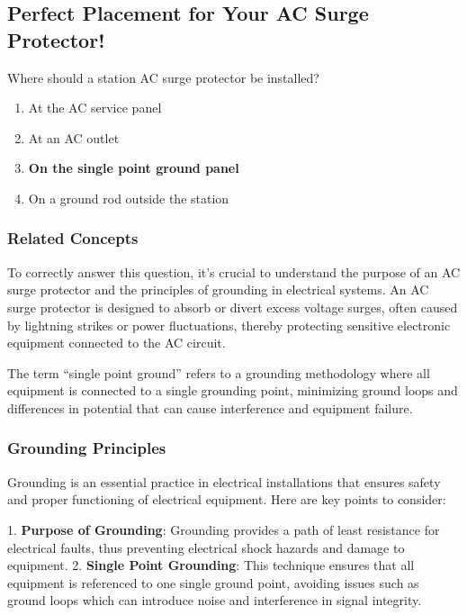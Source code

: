 \subsection{Perfect Placement for Your AC Surge Protector!}

\begin{tcolorbox}[colback=gray!10, colframe=black, title=E4E13]

Where should a station AC surge protector be installed?
\begin{enumerate}[label=\Alph*.]
    \item At the AC service panel
    \item At an AC outlet
    \item \textbf{On the single point ground panel}
    \item On a ground rod outside the station
\end{enumerate} \end{tcolorbox}

\subsubsection{Related Concepts}

To correctly answer this question, it’s crucial to understand the purpose of an AC surge protector and the principles of grounding in electrical systems. An AC surge protector is designed to absorb or divert excess voltage surges, often caused by lightning strikes or power fluctuations, thereby protecting sensitive electronic equipment connected to the AC circuit. 

The term “single point ground” refers to a grounding methodology where all equipment is connected to a single grounding point, minimizing ground loops and differences in potential that can cause interference and equipment failure.

\subsubsection{Grounding Principles}

Grounding is an essential practice in electrical installations that ensures safety and proper functioning of electrical equipment. Here are key points to consider:

1. \textbf{Purpose of Grounding}: Grounding provides a path of least resistance for electrical faults, thus preventing electrical shock hazards and damage to equipment.
2. \textbf{Single Point Grounding}: This technique ensures that all equipment is referenced to one single ground point, avoiding issues such as ground loops which can introduce noise and interference in signal integrity.

